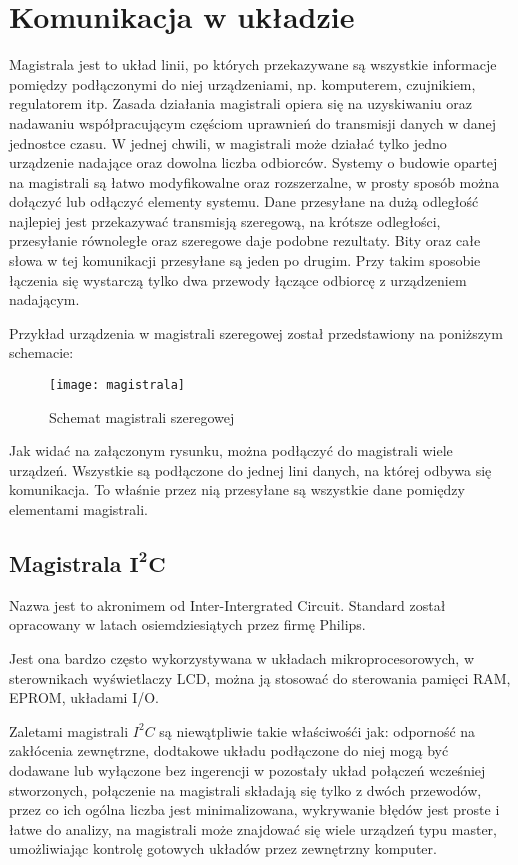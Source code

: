 \chapter{Komunikacja w układzie}
Magistrala jest to układ linii, po których przekazywane są wszystkie informacje pomiędzy podłączonymi do niej urządzeniami, np. komputerem, czujnikiem, regulatorem itp. Zasada działania magistrali opiera się na uzyskiwaniu oraz nadawaniu współpracującym częściom uprawnień do transmisji danych w danej jednostce czasu. W jednej chwili, w magistrali może działać tylko jedno urządzenie nadające oraz dowolna liczba odbiorców. Systemy o budowie opartej na magistrali są łatwo modyfikowalne oraz rozszerzalne, w prosty sposób można dołączyć lub odłączyć elementy systemu.
Dane przesyłane na dużą odległość najlepiej jest przekazywać transmisją szeregową, na krótsze odległości, przesyłanie równoległe oraz szeregowe daje podobne rezultaty.
Bity oraz całe słowa w tej komunikacji przesyłane są jeden po drugim. Przy takim sposobie łączenia się wystarczą tylko dwa przewody łączące odbiorcę z urządzeniem nadającym. 

Przykład urządzenia w magistrali szeregowej został przedstawiony na poniższym schemacie:
\begin{figure}[h]
\centering
\texttt{[image: magistrala]}
\caption{Schemat magistrali szeregowej}
\label{fig:magistrala}
\end{figure}

Jak widać na załączonym rysunku, można podłączyć do magistrali wiele urządzeń. Wszystkie są podłączone do jednej lini danych, na której odbywa się komunikacja. To właśnie przez nią przesyłane są wszystkie dane pomiędzy elementami magistrali.

\section{Magistrala $\mathbf{I^{2}C}$}
Nazwa jest to akronimem od Inter-Intergrated Circuit. Standard został opracowany w latach osiemdziesiątych przez firmę Philips.

Jest ona bardzo często wykorzystywana w układach mikroprocesorowych, w sterownikach wyświetlaczy LCD, można ją stosować do sterowania pamięci RAM, EPROM, układami I/O.

Zaletami magistrali $I^{2}C$ są niewątpliwie takie właściwośći jak: odporność na zakłócenia zewnętrzne, dodtakowe układu podłączone do niej mogą być dodawane lub wyłączone bez ingerencji w pozostały układ połączeń wcześniej stworzonych, połączenie na magistrali składają się tylko z dwóch przewodów, przez co ich ogólna liczba jest minimalizowana, wykrywanie błędów jest proste i łatwe do analizy, na magistrali może znajdować się wiele urządzeń typu master, umożliwiając kontrolę gotowych układów przez zewnętrzny komputer.

